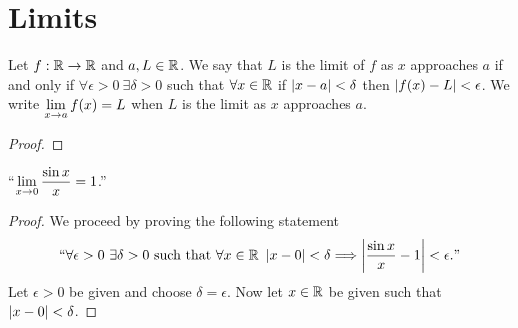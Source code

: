     \section{Limits}
        \begin{definition}
            Let $f: \mathbb{R} \rightarrow \mathbb{R}$ and $a, L \in \mathbb{R}$. We say that
            $L$ is the limit of $f$ as $x$ approaches $a$ if and only if
            $\forall \epsilon > 0 \ \exists \delta > 0$ such that $\forall x \in \mathbb{R}$
            if $\left|x - a\right| < \delta$ then $\left|f(x) - L\right| < \epsilon$.
            We write $\displaystyle\lim_{x \to a} f(x) = L$ when $L$ is the limit as $x$ approaches $a$.
        \end{definition}
        \begin{theorem}
        \end{theorem}
        \begin{proof}
        \end{proof}
        \begin{theorem}
            ``$\displaystyle\lim_{x \to 0} \frac{\sin x}{x} = 1$.''
        \end{theorem}
        \begin{proof}
            We proceed by proving the following statement
            \[
                ``\forall \epsilon > 0 \ \exists \delta > 0 \mbox{ such that } \forall x \in \mathbb{R} \
                \left|x - 0\right| < \delta \Longrightarrow \left|\frac{\sin x}{x} - 1\right| < \epsilon."
            \]
            Let $\epsilon > 0$ be given and choose $\delta = \epsilon$. Now let $x \in \mathbb{R}$
            be given such that $\left|x - 0\right| < \delta$.
        \end{proof}

